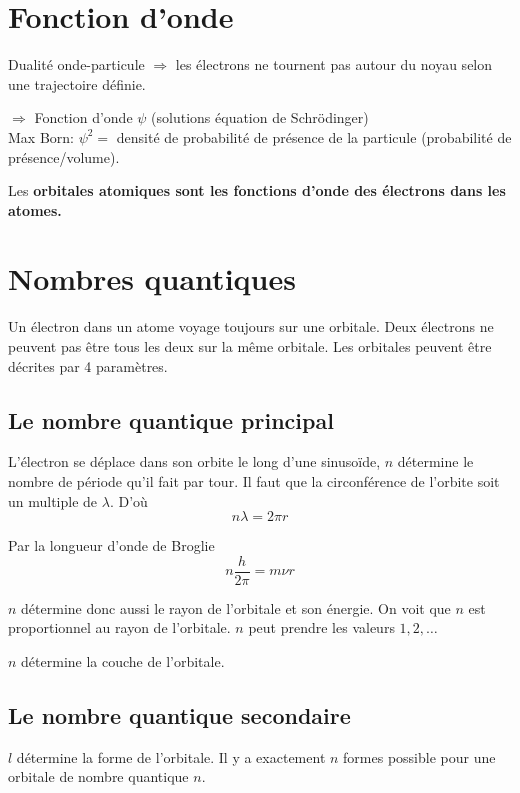 \documentclass[11pt,a4paper,french]{article}
\renewcommand{\textbf}[1]{\begingroup\bfseries\mathversion{bold}#1\endgroup}
\begin{document}
\section{Fonction d'onde}

Dualité onde-particule $\Rightarrow$ les électrons ne tournent pas autour du noyau selon une trajectoire définie.

$\Rightarrow$ Fonction d'onde $\psi$ (solutions équation de Schrödinger)\\

Max Born: $\psi^2 = $ densité de probabilité de présence de la particule (probabilité de présence/volume).

Les \textbf{orbitales atomiques} sont les fonctions d'onde des électrons dans les atomes.

\section{Nombres quantiques}

Un électron dans un atome voyage toujours sur une orbitale.
Deux électrons ne peuvent pas être tous les deux sur la même orbitale.
Les orbitales peuvent être décrites par 4 paramètres.

\subsection{Le nombre quantique principal}
L'électron se déplace dans son orbite le long d'une sinusoïde, $n$ détermine le nombre de période qu'il fait par tour.
Il faut que la circonférence de l'orbite soit un multiple de $\lambda$.
D'où
\[ n\lambda = 2\pi r \]

Par la longueur d'onde de Broglie
\[ n \frac{h}{2\pi} = m \nu r \]

$n$ détermine donc aussi le rayon de l'orbitale et son énergie.
On voit que $n$ est proportionnel au rayon de l'orbitale.
$n$ peut prendre les valeurs $1, 2, \ldots$

$n$ détermine la couche de l'orbitale.

\subsection{Le nombre quantique secondaire}
$l$ détermine la forme de l'orbitale.
Il y a exactement $n$ formes possible pour une orbitale de nombre quantique $n$.
\end{document}
